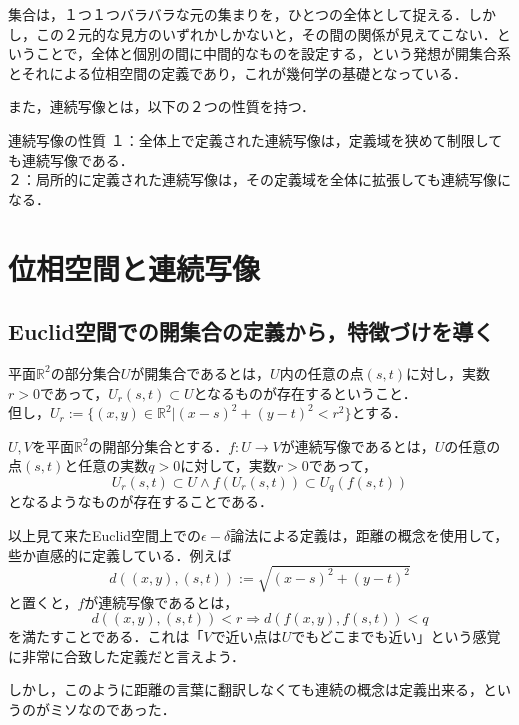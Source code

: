 \documentclass[uplatex, 12pt, a4paper, dvipdfmx]{jsarticle}
\begin{document}
集合は，１つ１つバラバラな元の集まりを，ひとつの全体として捉える．しかし，この２元的な見方のいずれかしかないと，その間の関係が見えてこない．ということで，全体と個別の間に中間的なものを設定する，という発想が開集合系とそれによる位相空間の定義であり，これが幾何学の基礎となっている．\par

また，連続写像とは，以下の２つの性質を持つ．
\begin{itembox}[l]{連続写像の性質}
    １：全体上で定義された連続写像は，定義域を狭めて制限しても連続写像である．\\
    ２：局所的に定義された連続写像は，その定義域を全体に拡張しても連続写像になる．
\end{itembox}

\section{位相空間と連続写像}

\subsection{Euclid空間での開集合の定義から，特徴づけを導く}

\begin{shadebox}\begin{definition}
    平面$\mathbb{R}^2$の部分集合$U$が開集合であるとは，$U$内の任意の点$(s,t)$に対し，実数$r>0$であって，$U_r(s,t)\subset U$となるものが存在するということ．\\
    但し，$U_r := \{ (x,y)\in\mathbb{R}^2 | (x-s)^2 + (y-t)^2 < r^2 \}$とする．
\end{definition}\end{shadebox}

\begin{shadebox}\begin{definition}
    $U,V$を平面$\mathbb{R}^2$の開部分集合とする．$f:U\longrightarrow V$が連続写像であるとは，$U$の任意の点$(s,t)$と任意の実数$q>0$に対して，実数$r>0$であって，$$U_r(s,t)\subset U \wedge f(U_r(s,t))\subset U_q(f(s,t))$$となるようなものが存在することである．
\end{definition}\end{shadebox}

以上見て来たEuclid空間上での$\epsilon -\delta$論法による定義は，距離の概念を使用して，些か直感的に定義している．例えば$$d((x,y),(s,t)):=\sqrt{(x-s)^2+(y-t)^2}$$と置くと，$f$が連続写像であるとは，$$d((x,y),(s,t))<r\Longrightarrow d(f(x,y),f(s,t))<q$$を満たすことである．これは「$V$で近い点は$U$でもどこまでも近い」という感覚に非常に合致した定義だと言えよう．\par
しかし，このように距離の言葉に翻訳しなくても連続の概念は定義出来る，というのがミソなのであった．
\end{document}
